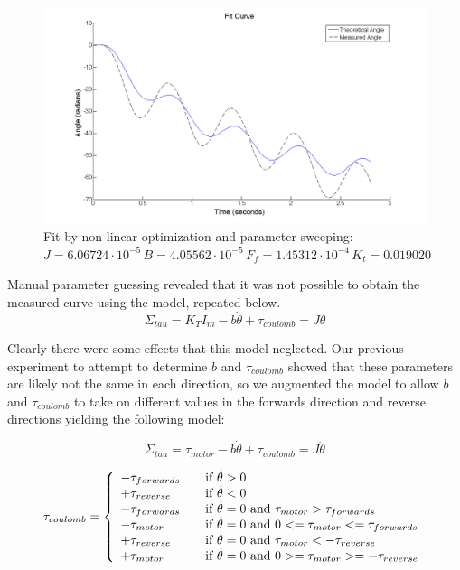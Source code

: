 \documentclass{article}
\theoremstyle{plain}
\theoremstyle{definition}
\theoremstyle{remark}
\begin{document}
\begin{figure}[htb]
\begin{center}
\includegraphics[width = 14cm]{2ndexamplefit.png}
\caption{Fit by non-linear optimization and parameter sweeping: $J = 6.06724 \cdot 10^{-5} \, B = 4.05562 \cdot 10^{-5} \, F_{f} = 1.45312 \cdot 10^{-4} \, K_{t} = 0.019020 $}
\label{q2_b7}
\end{center}
\end{figure}

Manual parameter guessing revealed that it was not possible to obtain the measured curve using the model, repeated below. 
$$ \Sigma_{tau} = K_{T}I_{m} - b\dot{\theta} + \tau_{coulomb} = J \ddot{\theta} $$

Clearly there were some effects that this model neglected.  Our previous experiment to attempt to determine $b$ and $\tau_{coulomb}$ showed that these parameters are likely not the same in each direction, so we augmented the model to allow $b$ and $\tau_{coulomb}$ to take on different values in the forwards direction and reverse directions yielding the following model:

$$ \Sigma_{tau} = \tau_{motor} - b\dot{\theta} + \tau_{coulomb} = J \ddot{\theta} $$

\[
  \tau_{coulomb} = \left\{
  \begin{array}{l l}
    	- \tau_{forwards} & \quad \text{if } \dot{\theta} > 0 \\
    	+ \tau_{reverse} & \quad \text{if } \dot{\theta} < 0 \\
	- \tau_{forwards} & \quad \text{if } \dot{\theta} = 0 \text{ and } \tau_{motor} > \tau_{forwards} \\
	- \tau_{motor} & \quad \text{if } \dot{\theta} = 0 \text{ and } 0 <= \tau_{motor} <= \tau_{forwards} \\
	+ \tau_{reverse} & \quad \text{if } \dot{\theta} = 0 \text{ and } \tau_{motor} < -\tau_{reverse} \\
	+ \tau_{motor} & \quad \text{if } \dot{\theta} = 0 \text{ and } 0 >=\tau_{motor} >= -\tau_{reverse}\\
  \end{array} \right.
\]
\end{document}
